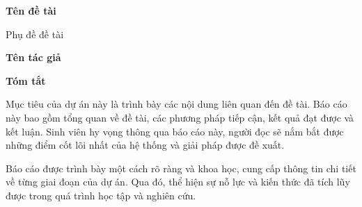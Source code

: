 \fancyhf{} %
\fancyfoot[R]{\thepage} %
\renewcommand{\headrulewidth}{0pt}

\begin{center}
    \Large
    \textbf{Tên đề tài}
    
    \vspace{0.4cm}
    \large
    Phụ đề đề tài
    
    \vspace{0.4cm}
    \textbf{Tên tác giả}
    
    \vspace{0.9cm}
    \textbf{Tóm tắt}
\end{center}

Mục tiêu của dự án này là trình bày các nội dung liên quan đến đề tài. Báo cáo này bao gồm tổng quan về đề tài, các phương pháp tiếp cận, kết quả đạt được và kết luận. Sinh viên hy vọng thông qua báo cáo này, người đọc sẽ nắm bắt được những điểm cốt lõi nhất của hệ thống và giải pháp được đề xuất.

Báo cáo được trình bày một cách rõ ràng và khoa học, cung cấp thông tin chi tiết về từng giai đoạn của dự án. Qua đó, thể hiện sự nỗ lực và kiến thức đã tích lũy được trong quá trình học tập và nghiên cứu.
